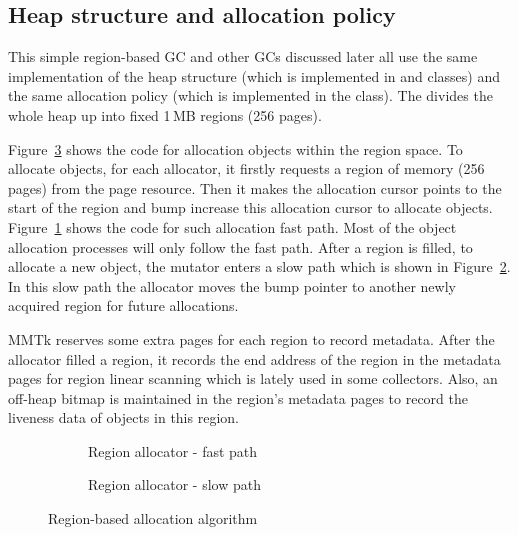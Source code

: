 \subsection{Heap structure and allocation policy}

This simple region-based GC and other GCs discussed later all use the same implementation of the
heap structure (which is implemented in  and  classes) and the
same allocation policy (which is implemented in the  class).
The  divides the whole heap up into fixed 1\,MB regions (256 pages).

Figure~\ref{fig:allocator} shows the code for allocation objects within the region space.
To allocate objects, for each allocator, it firstly requests a region of memory (256 pages) from the page resource.
Then it makes the allocation cursor points to the start of the region and bump increase this
allocation cursor to allocate objects. Figure~\ref{fig:allocator:fast} shows the code for such
allocation fast path. Most of the object allocation processes will only follow the
fast path. 
After a region is filled, to allocate a new object, the mutator enters a slow path
which is shown in Figure~\ref{fig:allocator:slow}.
In this slow path the allocator moves the bump pointer to another newly acquired region for future allocations.

MMTk reserves some extra pages for each region to record metadata.
After the allocator filled a region, it records the end address of the region in the metadata pages for 
region linear scanning which is lately used in some collectors. Also, an off-heap bitmap is
maintained in the region's metadata pages to record the liveness data of objects in this region.

\begin{figure}
  \centering
  \begin{subfigure}[a]{\textwidth}
    
    \caption{Region allocator - fast path}
    \label{fig:allocator:fast}
  \end{subfigure}

  \begin{subfigure}[b]{\textwidth}
    
    \caption{Region allocator - slow path}
    \label{fig:allocator:slow}
  \end{subfigure}

  \caption{Region-based allocation algorithm}
  \label{fig:allocator}
\end{figure}

